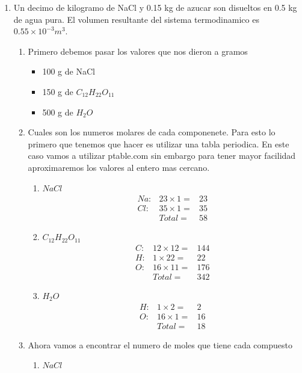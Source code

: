 \documentclass[12pt]{exam}
\begin{document}
\begin{enumerate} %

	\item Un decimo de kilogramo de NaCl y 0.15 kg de azucar son disueltos en 0.5 kg de agua pura. El volumen resultante del sistema termodinamico es $0.55\times10^{-3}m^3$.
		\begin{enumerate}
			\item Primero debemos pasar los valores que nos dieron a gramos
				\begin{itemize}
					\item 100 g de NaCl
					\item 150 g de $C_{12}H_{22}O_{11}$
					\item 500 g de $H_2O$
				\end{itemize}
			\item Cuales son los numeros molares de cada componenete.
				Para esto lo primero que tenemos que hacer es utilizar una tabla periodica. En este caso vamos a utilizar ptable.com sin embargo para tener mayor facilidad aproximaremos los valores al entero mas cercano.
				\begin{enumerate}
					\item $NaCl$
						\begin{eqnarray*}
							Na: & 23\times 1 =&23\\
							Cl: & 35\times 1 =&35\\
							&Total =&58
						\end{eqnarray*}
					\item $C_{12}H_{22}O_{11}$
						\begin{eqnarray*}
							C:&12\times 12=&144\\
							H:&1\times 22=&22\\
							O:&16\times 11=&176\\
							& Total =& 342
						\end{eqnarray*}
					\item $H_2O$
						\begin{eqnarray*}
							H: & 1\times 2= & 2\\
							O: & 16\times 1= & 16\\
							& Total = & 18
						\end{eqnarray*}
				\end{enumerate}
			\item Ahora vamos a encontrar el numero de moles que tiene cada compuesto
				\begin{enumerate}
					\item $NaCl$

\end{enumerate}
\end{enumerate}
\end{enumerate}
\end{document}
